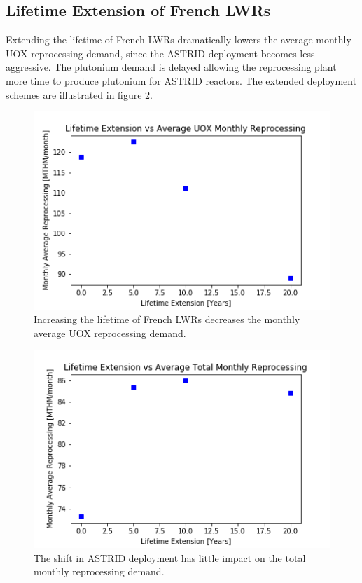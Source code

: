\subsection{Lifetime Extension of French \glspl{LWR}}
Extending the lifetime of French \glspl{LWR} dramatically lowers the average
monthly \gls{UOX} reprocessing demand, since the \gls{ASTRID} deployment becomes less
aggressive. The plutonium demand is delayed allowing the reprocessing plant more
time to produce plutonium for \gls{ASTRID} reactors. The
extended deployment schemes are illustrated in figure \ref{fig:ext}. 

\begin{figure}[htbp!]
    \begin{center}
        \includegraphics[scale=0.6]{./images/sensitivity/ext_uox.png}
    \end{center}
    \caption{Increasing the lifetime of French \glspl{LWR} decreases the monthly
             average \gls{UOX} reprocessing demand.}
    \label{fig:ext}
\end{figure}


\begin{figure}[htbp!]
    \begin{center}
        \includegraphics[scale=0.6]{./images/sensitivity/ext_all.png}
    \end{center}
    \caption{The shift in \gls{ASTRID} deployment has little impact on the total monthly
             reprocessing demand.}
    \label{fig:ext}
\end{figure}


